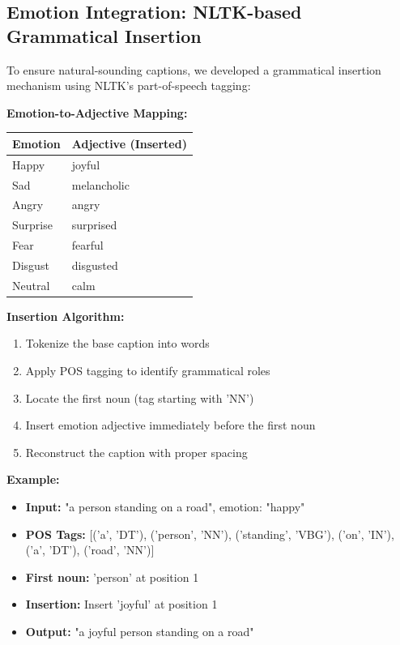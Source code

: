 \documentclass[12pt]{article}
\begin{document}
\subsection{Emotion Integration: NLTK-based Grammatical Insertion}

To ensure natural-sounding captions, we developed a grammatical insertion mechanism using NLTK's part-of-speech tagging:

\textbf{Emotion-to-Adjective Mapping:}
\begin{center}
\begin{tabular}{ll}
\toprule
\textbf{Emotion} & \textbf{Adjective (Inserted)} \\
\midrule
Happy & joyful \\
Sad & melancholic \\
Angry & angry \\
Surprise & surprised \\
Fear & fearful \\
Disgust & disgusted \\
Neutral & calm \\
\bottomrule
\end{tabular}
\end{center}

\textbf{Insertion Algorithm:}
\begin{enumerate}
\item Tokenize the base caption into words
\item Apply POS tagging to identify grammatical roles
\item Locate the first noun (tag starting with 'NN')
\item Insert emotion adjective immediately before the first noun
\item Reconstruct the caption with proper spacing
\end{enumerate}

\textbf{Example:}
\begin{itemize}
\item \textbf{Input:} "a person standing on a road", emotion: "happy"
\item \textbf{POS Tags:} [('a', 'DT'), ('person', 'NN'), ('standing', 'VBG'), ('on', 'IN'), ('a', 'DT'), ('road', 'NN')]
\item \textbf{First noun:} 'person' at position 1
\item \textbf{Insertion:} Insert 'joyful' at position 1
\item \textbf{Output:} "a joyful person standing on a road"
\end{itemize}
\end{document}
